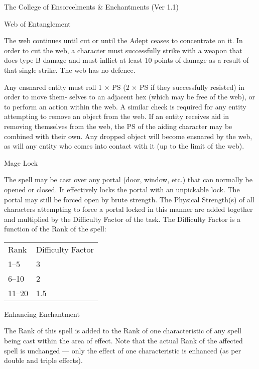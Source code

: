\begin{Chapter}{The College of Ensorcelments \& Enchantments (Ver 1.1)}
\begin{spell}[S-5]{Web of Entanglement}
\begin{effects}
The web continues until cut or until the Adept ceases to concentrate
on it. In order to cut the web, a character must successfully strike
with a weapon that does type B damage and must inflict at least 10
points of damage as a result of that single strike.  The web has no
defence.

Any ensnared entity must roll 1 × PS (2 × PS if they successfully
resisted) in order to move them- selves to an adjacent hex (which may
be free of the web), or to perform an action within the web.  A
similar check is required for any entity attempting to remove an
object from the web.  If an entity receives aid in removing themselves
from the web, the PS of the aiding character may be combined with
their own.  Any dropped object will become ensnared by the web, as
will any entity who comes into contact with it (up to the limit of the
web).
\end{effects}
\end{spell}

\begin{spell}[S-6]{Mage Lock}

\begin{effects}
The spell may be cast over any portal (door, window, etc.)  that can
normally be opened or closed.  It effectively locks the portal with an
unpickable lock.  The portal may still be forced open by brute
strength.  The Physical Strength(s) of all characters attempting to
force a portal locked in this manner are added together and multiplied
by the Difficulty Factor of the task.  The Difficulty Factor is a
function of the Rank of the spell:
\begin{tabularx}{\columnwidth}{lX}
Rank	& Difficulty Factor \\
1--5	& 3 \\
6--10	& 2 \\ 
11--20	& 1.5 \\
\end{tabularx}
\end{effects}
\end{spell}

\begin{spell}[S-7]{Enhancing Enchantment}
\begin{effects}
The Rank of this spell is added to the Rank of one characteristic of
any spell being cast within the area of effect. Note that the actual
Rank of the affected spell is unchanged --- only the effect of one
characteristic is enhanced (as per double and triple effects).


\end{effects}
\end{spell}
\end{Chapter}
